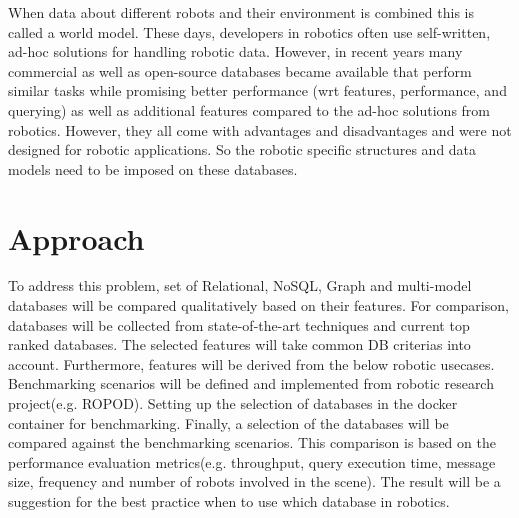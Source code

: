 \documentclass[12pt]{article}
\begin{document}
When data about different robots and their environment is combined this is called a world model. These days, developers in robotics often use self-written, ad-hoc solutions for handling robotic data. However, in recent years many commercial as well as open-source databases became available that perform similar tasks while promising better performance (wrt features, performance, and querying) as well as additional features compared to the ad-hoc solutions from robotics. However, they all come with advantages and disadvantages and were not designed for robotic applications. So the robotic specific structures and data models need to be imposed on these databases.
\\

\section{Approach}
To address this problem, set of Relational, NoSQL, Graph and multi-model databases will be compared qualitatively based on their features. For comparison, databases will be collected from state-of-the-art techniques and current top ranked databases. The selected features will take common DB criterias into account. Furthermore, features will be derived from the below robotic usecases. Benchmarking scenarios will be defined and implemented from robotic research project(e.g. ROPOD). Setting up the selection of databases in the docker container for benchmarking. Finally, a selection of the databases will be compared against the benchmarking scenarios. This comparison is based on the performance evaluation metrics(e.g. throughput, query execution time, message size, frequency and number of robots involved in the scene). The result will be a suggestion for the best practice when to use which database in robotics.

\newpage
\end{document}
